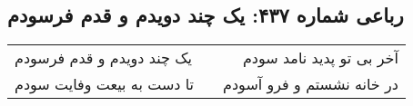 \begin{center}
\section*{رباعی شماره ۴۳۷: یک چند دویدم و قدم فرسودم}
\label{sec:sh437}
\begin{longtable}{l p{0.5cm} r}
یک چند دویدم و قدم فرسودم
&&
آخر بی تو پدید نامد سودم
\\
تا دست به بیعت وفایت سودم
&&
در خانه نشستم و فرو آسودم
\\
\end{longtable}
\end{center}

